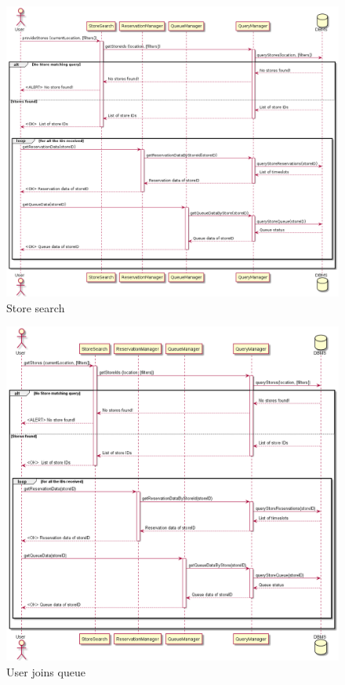 \begin{figure}[H]
    \includegraphics[width=\linewidth]{uml/seq_search_store.png}
    \caption{Store search}
    \label{fig:seq_store_search}
\end{figure}

\begin{figure}[H]
    \includegraphics[width=\linewidth]{uml/seq_join_queue.png}
    \caption{User joins queue}
    \label{fig:seq_join_queue}
\end{figure}


